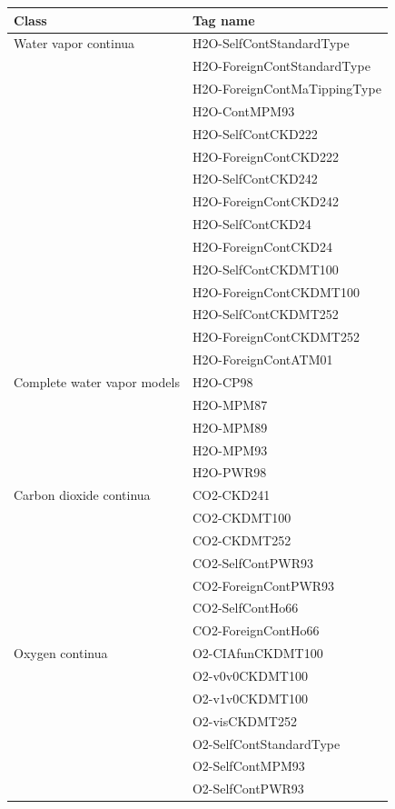 \begin{table}
\centering
\footnotesize
\begin{tabular}{ll}
\hline  
Class & Tag name \\
\hline  

Water vapor continua
& H2O-SelfContStandardType \\
& H2O-ForeignContStandardType \\
& H2O-ForeignContMaTippingType \\
& H2O-ContMPM93 \\
& H2O-SelfContCKD222 \\
& H2O-ForeignContCKD222 \\
& H2O-SelfContCKD242 \\
& H2O-ForeignContCKD242 \\
& H2O-SelfContCKD24 \\
& H2O-ForeignContCKD24 \\
& H2O-SelfContCKDMT100 \\
& H2O-ForeignContCKDMT100 \\
& H2O-SelfContCKDMT252 \\
& H2O-ForeignContCKDMT252 \\
& H2O-ForeignContATM01 \\[1ex]

Complete water vapor models
& H2O-CP98 \\
& H2O-MPM87 \\
& H2O-MPM89 \\
& H2O-MPM93 \\
& H2O-PWR98 \\[1ex]

Carbon dioxide continua 
& CO2-CKD241 \\
& CO2-CKDMT100 \\
& CO2-CKDMT252 \\
& CO2-SelfContPWR93 \\
& CO2-ForeignContPWR93 \\
& CO2-SelfContHo66 \\
& CO2-ForeignContHo66 \\[1ex]

Oxygen continua 
& O2-CIAfunCKDMT100 \\
& O2-v0v0CKDMT100 \\
& O2-v1v0CKDMT100 \\
& O2-visCKDMT252 \\
& O2-SelfContStandardType \\
& O2-SelfContMPM93 \\
& O2-SelfContPWR93 \\[1ex]


\end{tabular}
\end{table}
